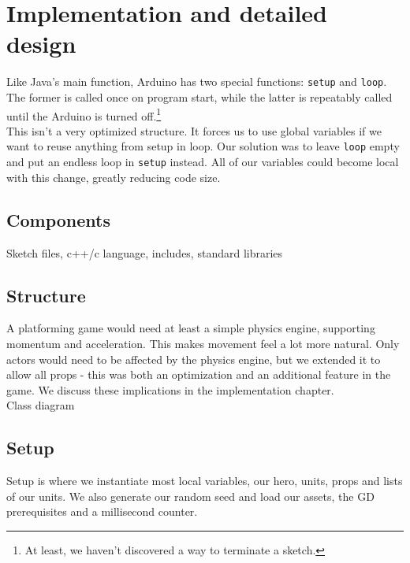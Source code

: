 \chapter{Implementation and detailed design} %
Like Java's main function, Arduino has two special functions: {\tt setup} and {\tt loop}. The former is called once on program start, while the latter is repeatably called until the Arduino is turned off.\footnote{At least, we haven't discovered a way to terminate a sketch.}\\
This isn't a very optimized structure. It forces us to use global variables if we want to reuse anything from setup in loop. Our solution was to leave {\tt loop} empty and put an endless loop in {\tt setup} instead. All of our variables could become local with this change, greatly reducing code size.\\

\section{Components}
Sketch files, c++/c language, includes, standard libraries

\section{Structure} %
A platforming game would need at least a simple physics engine, supporting momentum and acceleration. This makes movement feel a lot more natural. Only actors would need to be affected by the physics engine, but we extended it to allow all props - this was both an optimization and an additional feature in the game. We discuss these implications in the implementation chapter.\\
Class diagram

\section{Setup}
Setup is where we instantiate most local variables, our hero, units, props and lists of our units. We also generate our random seed and load our assets, the GD prerequisites and a millisecond counter.

